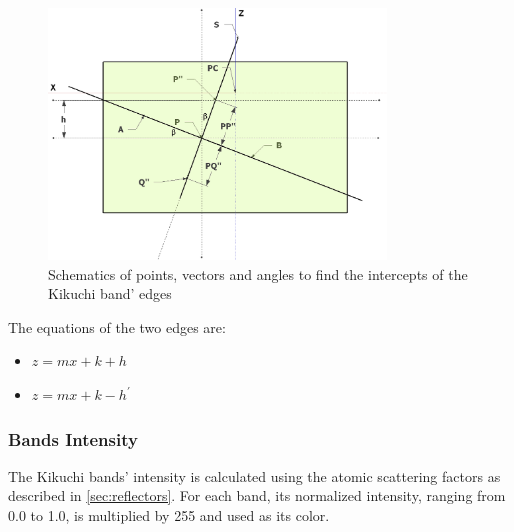 \documentclass[letterpaper]{article}
\begin{document}
	\begin{figure}
		\centering
		\includegraphics[width=0.8\textwidth]{figures/widthangle4}
		\caption{Schematics of points, vectors and angles to find the intercepts of the Kikuchi band' edges}
		\label{fig:widthangle4}
	\end{figure}
	
	The equations of the two edges are:
	\begin{itemize}
		\item $z = mx + k + h$
		\item $z = mx + k - h^\prime$
	\end{itemize}
	
	\subsubsection{Bands Intensity}
	The Kikuchi bands' intensity is calculated using the atomic scattering factors as described in \ref{sec:reflectors}.
	For each band, its normalized intensity, ranging from 0.0 to 1.0, is multiplied by 255 and used as its color.
	
	
\end{document}
